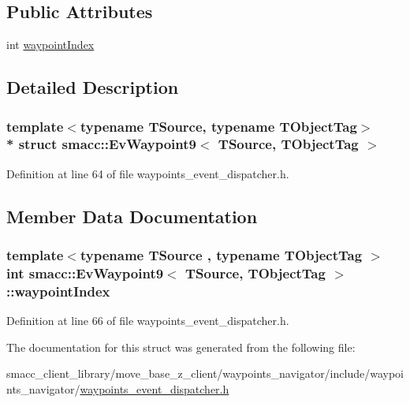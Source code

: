 \subsection*{Public Attributes}
\begin{DoxyCompactItemize}
\item 
int \hyperlink{structsmacc_1_1EvWaypoint9_adb8b5d2e204497b5dd9436428d163ba5}{waypoint\+Index}
\end{DoxyCompactItemize}


\subsection{Detailed Description}
\subsubsection*{template$<$typename T\+Source, typename T\+Object\+Tag$>$\\*
struct smacc\+::\+Ev\+Waypoint9$<$ T\+Source, T\+Object\+Tag $>$}



Definition at line 64 of file waypoints\+\_\+event\+\_\+dispatcher.\+h.



\subsection{Member Data Documentation}
\subsubsection[{\texorpdfstring{waypoint\+Index}{waypointIndex}}]{\setlength{\rightskip}{0pt plus 5cm}template$<$typename T\+Source , typename T\+Object\+Tag $>$ int {\bf smacc\+::\+Ev\+Waypoint9}$<$ T\+Source, T\+Object\+Tag $>$\+::waypoint\+Index}\hypertarget{structsmacc_1_1EvWaypoint9_adb8b5d2e204497b5dd9436428d163ba5}{}\label{structsmacc_1_1EvWaypoint9_adb8b5d2e204497b5dd9436428d163ba5}


Definition at line 66 of file waypoints\+\_\+event\+\_\+dispatcher.\+h.



The documentation for this struct was generated from the following file\+:\begin{DoxyCompactItemize}
\item 
smacc\+\_\+client\+\_\+library/move\+\_\+base\+\_\+z\+\_\+client/waypoints\+\_\+navigator/include/waypoints\+\_\+navigator/\hyperlink{waypoints__event__dispatcher_8h}{waypoints\+\_\+event\+\_\+dispatcher.\+h}\end{DoxyCompactItemize}
